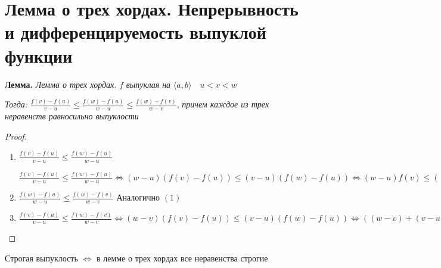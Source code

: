 \section{Лемма о трех хордах. Непрерывность и дифференцируемость выпуклой функции}

\textbf{Лемма.}
\textit{
    Лемма о трех хордах.
} \quad $f$ \textit{
    выпуклая на 
} $\langle a, b \rangle \quad u < v < w$

\textit{Тогда: }$\frac{f(v) - f(u)}{v - u} \leqslant \frac{f(w) - f(u)}{w - u} \leqslant \frac{f(w) - f(v)}{w - v}$,
\textit{
    причем каждое из трех неравенств равносильно выпуклости
}
\begin{proof} \quad 

    \begin{enumerate} 
        \item $\frac{f(v) - f(u)}{v - u} \leqslant \frac{f(w) - f(u)}{w - u}$

        $\frac{f(v) - f(u)}{v - u} \leqslant \frac{f(w) - f(u)}{w - u} \Longleftrightarrow (w - u)
        (f(v) - f(u)) \leqslant (v - u)(f(w) - f(u)) \Longleftrightarrow (w-u)f(v) \leqslant
        ((w - u) - (v - u))f(u) + (v - u)f(w) = (w - v)f(u) + (v - u)f(w)$ 
        \item $\frac{f(w) - f(u)}{w - u} \leqslant \frac{f(w) - f(v)}{w - v}$ \qquad
        Аналогично $(1)$
        \item $\frac{f(v) - f(u)}{v - u} \leqslant \frac{f(w) - f(v)}{w - v} \Longleftrightarrow (w - v)
        (f(v) - f(u)) \leqslant (v - u)(f(w) - f(u)) \Longleftrightarrow ((w - v) + (v - u))f(v) \leqslant (w - v)f(u) +
        (v - u)f(w) \Longleftrightarrow (w - u)f(v) \leqslant (w - v)f(u) + (v - u)f(w)$
    \end{enumerate}
\end{proof}

\notice \; Строгая выпуклость $\Longleftrightarrow$ в лемме о трех хордах все неравенства строгие

